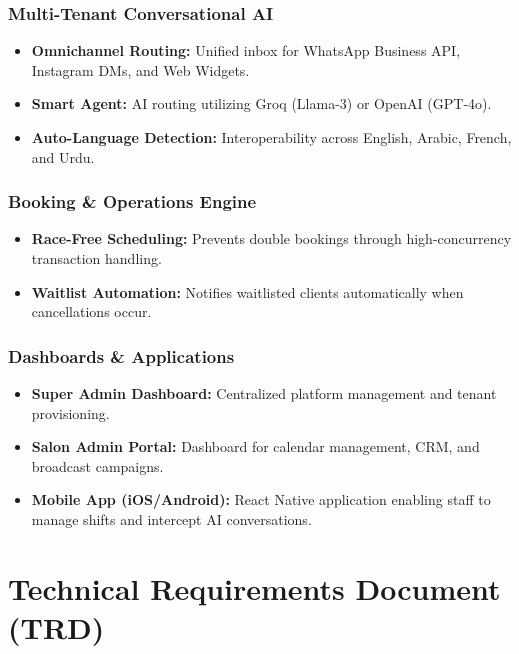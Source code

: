 \documentclass[11pt,a4paper]{report}
\begin{document}
\subsection{Multi-Tenant Conversational AI}
\begin{itemize}
    \item \textbf{Omnichannel Routing:} Unified inbox for WhatsApp Business API, Instagram DMs, and Web Widgets.
    \item \textbf{Smart Agent:} AI routing utilizing Groq (Llama-3) or OpenAI (GPT-4o).
    \item \textbf{Auto-Language Detection:} Interoperability across English, Arabic, French, and Urdu.
\end{itemize}

\subsection{Booking \& Operations Engine}
\begin{itemize}
    \item \textbf{Race-Free Scheduling:} Prevents double bookings through high-concurrency transaction handling.
    \item \textbf{Waitlist Automation:} Notifies waitlisted clients automatically when cancellations occur.
\end{itemize}

\subsection{Dashboards \& Applications}
\begin{itemize}
    \item \textbf{Super Admin Dashboard:} Centralized platform management and tenant provisioning.
    \item \textbf{Salon Admin Portal:} Dashboard for calendar management, CRM, and broadcast campaigns.
    \item \textbf{Mobile App (iOS/Android):} React Native application enabling staff to manage shifts and intercept AI conversations.
\end{itemize}

\chapter{Technical Requirements Document (TRD)}
\end{document}
